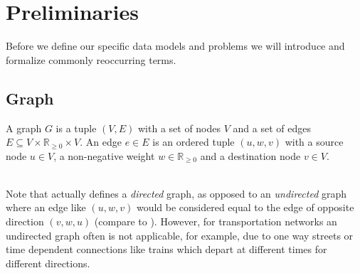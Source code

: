 \chapter{Preliminaries}\label{preliminaries}
	Before we define our specific data models and problems we will introduce and formalize commonly reoccurring terms.

\section{Graph}
	\begin{mydef}\label{graph}
		A \textnormal{graph} $G$ is a tuple $(V, E)$ with a set of nodes $V$ and a set of
		edges $E \subseteq V \times \mathbb{R}_{\ge 0} \times V$.
		An \textnormal{edge} $e \in E$ is an ordered tuple $(u, w, v)$ with a source node $u \in V$, a non-negative
		weight $w \in \mathbb{R}_{\ge 0}$ and a destination node $v \in V$.
	\end{mydef}\quad\\
	Note that  actually defines a \textit{directed} graph, as opposed to an \textit{undirected} graph where an
	edge like $(u, w, v)$ would be considered equal to the edge of opposite direction $(v, w, u)$ (compare to ).
	However, for transportation networks an undirected graph often is not applicable, for example, due to one way streets or
	time dependent connections like trains which depart at different times for different directions.
	
